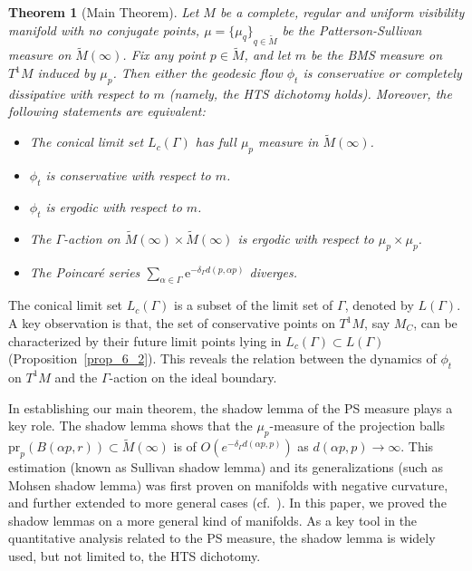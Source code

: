 \documentclass[reqno,11pt]{article}
\newtheorem{theorem}{Theorem}[section]
\theoremstyle{definition}
\theoremstyle{remark}
\numberwithin{equation}{section}
\begin{document}
\begin{theorem}[Main Theorem]
	Let $M$ be a complete, regular and uniform visibility manifold with no conjugate points, $\mu={\{\mu_q\}}_{q\in\widetilde{M}}$ be the Patterson-Sullivan measure on $\widetilde{M}(\infty)$. Fix any point $p\in\widetilde{M}$, and let $m$ be the BMS measure on $T^1M$ induced by $\mu_p$. Then either the geodesic flow $\phi_t$ is conservative or completely dissipative with respect to $m$ (namely, the HTS dichotomy holds). Moreover, the following statements are equivalent:\vspace{-1.5ex}
	\begin{itemize}
		\item The conical limit set $L_c(\Gamma)$ has full $\mu_p$ measure in $\widetilde{M}(\infty)$.
		\item $\phi_t$ is conservative with respect to $m$.
		\item $\phi_t$ is ergodic with respect to $m$.
		\item The $\Gamma$-action on $\widetilde{M}(\infty)\times\widetilde{M}(\infty)$ is ergodic with respect to $\mu_p\times\mu_p$.
		\item The Poincar\'e series $\sum_{\alpha\in\Gamma}\mathrm{e}^{-\delta_\Gamma d(p,\alpha p)}$ diverges.
	\end{itemize}
\end{theorem}

The conical limit set $L_c(\Gamma)$ is a subset of the limit set of $\Gamma$, denoted by $L(\Gamma)$. A key observation is that, the set of conservative points on $T^1M$, say $M_{C}$, can be characterized by their future limit points lying in $L_c(\Gamma)\subset L(\Gamma)$ (Proposition~\ref{prop_6_2}). This reveals the relation between the dynamics of $\phi_t$ on $T^1M$ and the $\Gamma$-action on the ideal boundary.

In establishing our main theorem, the shadow lemma of the PS measure plays a key role. The shadow lemma shows that the $\mu_p$-measure of the projection balls $\text{pr}_p(B(\alpha p,r))\subset \widetilde{M}(\infty)$ is of $O(e^{-\delta_{\Gamma}d(\alpha p, p)})$ as $d(\alpha p, p)\rightarrow \infty$. This estimation (known as Sullivan shadow lemma) and its generalizations (such as Mohsen shadow lemma) was first proven on manifolds with negative curvature, and further extended to more general cases (cf.~\cite{Su2, PPS, Kn4, Yue1}). In this paper, we proved the shadow lemmas on a more general kind of manifolds. As a key tool in the quantitative analysis related to the PS measure, the shadow lemma is widely used, but not limited to, the HTS dichotomy.
\end{document}
